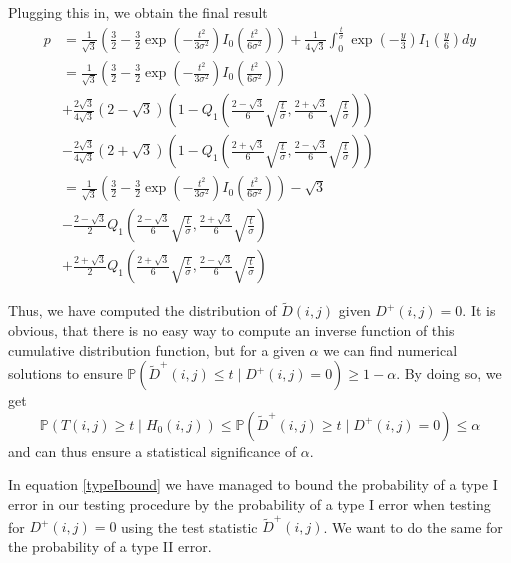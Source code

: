 \documentclass[a4paper,12pt]{article}
\theoremstyle{plain}
\theoremstyle{definition}
\theoremstyle{remark}
\begin{document}
Plugging this in, we obtain the final result
\begin{align*}
	p &= \frac{1}{\sqrt{3}} \left( \frac{3}{2} - \frac{3}{2} \exp \left( - \frac{t^2}{3 \sigma^2} \right) I_0 \left( \frac{t^2}{6 \sigma^2} \right) \right) + \frac{1}{4 \sqrt{3}} \int_0^\frac{t}{\sigma} \exp \left( - \frac{y}{3} \right) I_1 \left( \frac{y}{6} \right) dy \\
	&= \frac{1}{\sqrt{3}} \left( \frac{3}{2} - \frac{3}{2} \exp \left( - \frac{t^2}{3 \sigma^2} \right) I_0 \left( \frac{t^2}{6 \sigma^2} \right) \right) \\
	&+ \frac{2 \sqrt{3}}{4 \sqrt{3}} (2 - \sqrt{3}) \left( 1 - Q_1 \left( \frac{2 - \sqrt{3}}{6} \sqrt{\frac{t}{\sigma}}, \frac{2 + \sqrt{3}}{6} \sqrt{\frac{t}{\sigma}} \right) \right) \\
	&- \frac{2 \sqrt{3}}{4 \sqrt{3}} (2 + \sqrt{3}) \left( 1 - Q_1 \left( \frac{2 + \sqrt{3}}{6} \sqrt{\frac{t}{\sigma}}, \frac{2 - \sqrt{3}}{6} \sqrt{\frac{t}{\sigma}} \right) \right) \\
	&= \frac{1}{\sqrt{3}} \left( \frac{3}{2} - \frac{3}{2} \exp \left( - \frac{t^2}{3 \sigma^2} \right) I_0 \left( \frac{t^2}{6 \sigma^2} \right) \right) - \sqrt{3} \\
	&- \frac{2 - \sqrt{3}}{2} Q_1 \left( \frac{2 - \sqrt{3}}{6} \sqrt{\frac{t}{\sigma}}, \frac{2 + \sqrt{3}}{6} \sqrt{\frac{t}{\sigma}} \right) \\
	&+ \frac{2 + \sqrt{3}}{2} Q_1 \left( \frac{2 + \sqrt{3}}{6} \sqrt{\frac{t}{\sigma}}, \frac{2 - \sqrt{3}}{6} \sqrt{\frac{t}{\sigma}} \right)
\end{align*}

Thus, we have computed the distribution of $\tilde{D}(i, j)$ given $D^+(i, j) = 0$. It is obvious, that there is no easy way to compute an inverse function of this cumulative distribution function, but for a given $\alpha$ we can find numerical solutions to ensure $\mathbb{P}(\tilde{D}^+(i, j) \leq t \mid D^+(i, j) = 0) \geq 1 - \alpha$. By doing so, we get
\begin{equation}
	\mathbb{P}(T(i, j) \geq t \mid H_0(i, j)) \leq \mathbb{P}(\tilde{D}^+(i, j) \geq t \mid D^+(i, j) = 0) \leq \alpha
\end{equation}
and can thus ensure a statistical significance of $\alpha$.

\newpage

In equation \ref{typeIbound} we have managed to bound the probability of a type I error in our testing procedure by the probability of a type I error when testing for $D^+(i, j) = 0$ using the test statistic $\tilde{D}^+(i, j)$. We want to do the same for the probability of a type II error.
\end{document}
